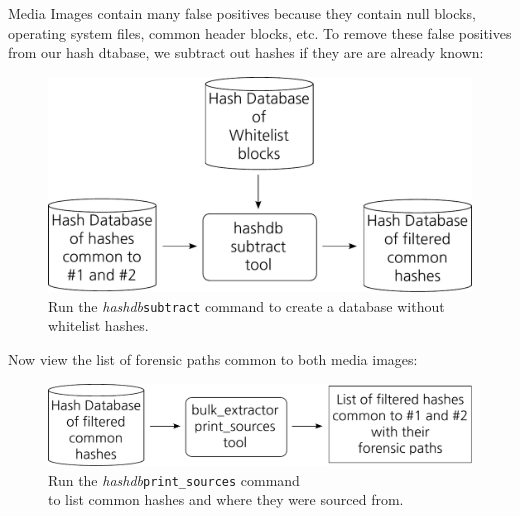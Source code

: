 \documentclass[12pt,twoside]{article}
\newcommand{\hdb}{\emph{hashdb}\xspace}
\begin{document}
Media Images contain many false positives because they contain
null blocks, operating system files, common header blocks, etc.
To remove these false positives from our hash dtabase,
we subtract out hashes if they are are already known:

\begin{figure}[H]
  \center
  \includegraphics[scale=0.6]{drawings/subtract_whitelist}
  \caption*{Run the \hdb \texttt{subtract} command to create a database without whitelist hashes.}
\end{figure}

Now view the list of forensic paths common to both media images:

\begin{figure}[H]
  \center
  \includegraphics[scale=0.6]{drawings/print_sources}
  \caption*{Run the \hdb \texttt{print\_sources} command \\
            to list common hashes and where they were sourced from.}
\end{figure}

\end{document}
